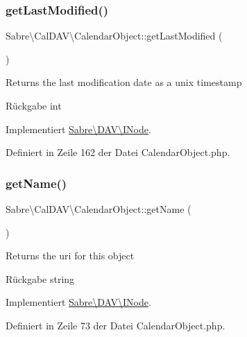 \subsubsection{\texorpdfstring{get\+Last\+Modified()}{getLastModified()}}
{\footnotesize\ttfamily Sabre\textbackslash{}\+Cal\+D\+A\+V\textbackslash{}\+Calendar\+Object\+::get\+Last\+Modified (\begin{DoxyParamCaption}{ }\end{DoxyParamCaption})}

Returns the last modification date as a unix timestamp

\begin{DoxyReturn}{Rückgabe}
int 
\end{DoxyReturn}


Implementiert \mbox{\hyperlink{interface_sabre_1_1_d_a_v_1_1_i_node_a06335f81c7d4ec2c6d9e327c8ce61014}{Sabre\textbackslash{}\+D\+A\+V\textbackslash{}\+I\+Node}}.



Definiert in Zeile 162 der Datei Calendar\+Object.\+php.

\mbox{\label{class_sabre_1_1_cal_d_a_v_1_1_calendar_object_a99fc7894745ccc28aff30a587f39536b}} 
\subsubsection{\texorpdfstring{get\+Name()}{getName()}}
{\footnotesize\ttfamily Sabre\textbackslash{}\+Cal\+D\+A\+V\textbackslash{}\+Calendar\+Object\+::get\+Name (\begin{DoxyParamCaption}{ }\end{DoxyParamCaption})}

Returns the uri for this object

\begin{DoxyReturn}{Rückgabe}
string 
\end{DoxyReturn}


Implementiert \mbox{\hyperlink{interface_sabre_1_1_d_a_v_1_1_i_node_ab616fe836b1ae36af12126a2bc934dce}{Sabre\textbackslash{}\+D\+A\+V\textbackslash{}\+I\+Node}}.



Definiert in Zeile 73 der Datei Calendar\+Object.\+php.

